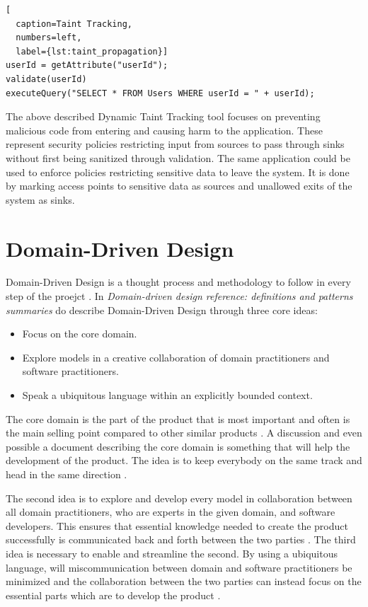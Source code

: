 \hfill
\begin{lstlisting}[
  caption=Taint Tracking,
  numbers=left,
  label={lst:taint_propagation}]
userId = getAttribute("userId");
validate(userId)
executeQuery("SELECT * FROM Users WHERE userId = " + userId);
\end{lstlisting}
\hfill

The above described Dynamic Taint Tracking tool focuses on preventing malicious code from entering and causing harm to the application. These represent security policies restricting input from sources to pass through sinks without first being sanitized through validation. The same application could be used to enforce policies restricting sensitive data to leave the system. It is done by marking access points to sensitive data as sources and unallowed exits of the system as sinks.



\section{Domain-Driven Design}
\label{DomainDrivenDesign}
Domain-Driven Design is a thought process and methodology to follow in every step of the proejct \parencite{EvansEric2004Dd:t}. In \emph{Domain-driven design reference: definitions and patterns summaries} do \textcite{evans_2015} describe Domain-Driven Design through three core ideas:

\begin{itemize}
    \item Focus on the core domain.
    \item Explore models in a creative collaboration of domain practitioners and software practitioners.
    \item Speak a ubiquitous language within an explicitly bounded context.
\end{itemize}

The core domain is the part of the product that is most important and often is the main selling point compared to other similar products \parencite{millett_2015}. A discussion and even possible a document describing the core domain is something that will help the development of the product. The idea is to keep everybody on the same track and head in the same direction \parencite{EvansEric2004Dd:t}.

The second idea is to explore and develop every model in collaboration between all domain practitioners, who are experts in the given domain, and software developers. This ensures that essential knowledge needed to create the product successfully is communicated back and forth between the two parties \parencite{millett_2015}. The third idea is necessary to enable and streamline the second. By using a ubiquitous language, will miscommunication between domain and software practitioners be minimized and the collaboration between the two parties can instead focus on the essential parts which are to develop the product \parencite{evans_2015}.

